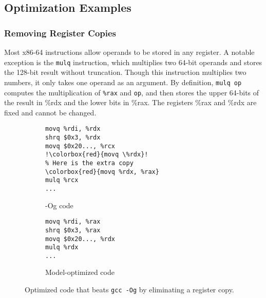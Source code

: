 \documentclass{article}
\begin{document}
\subsection{Optimization Examples}

\newcommand{\ozerocodecaption}{-O0 code\xspace}
\newcommand{\ogcodecaption}{-Og code\xspace}
\newcommand{\modelcodecaption}{Model-optimized code\xspace}
\newcommand{\codeboxwidth}{.47\columnwidth}

\subsubsection{Removing Register Copies}

Most x86-64 instructions allow operands to be stored in any register.  A notable exception is the  \texttt{mulq} instruction, which multiplies two 64-bit operands and stores the 128-bit result without truncation.
%
Though this instruction multiplies two numbers, it only takes one operand as an argument.  By definition, \texttt{mulq op} computes the multiplication of \texttt{\%rax} and \texttt{op}, and then stores the upper 64-bits of the result in \%rdx and the lower bits in \%rax.  The registers \%rax and \%rdx are fixed and cannot be changed.
%
\begin{figure}

    \begin{subfigure}[t]{\codeboxwidth}
    \begin{lstlisting}[language={[x64]Assembler},escapechar=!] 
movq %rdi, %rdx
shrq $0x3, %rdx
movq $0x20..., %rcx
!\colorbox{red}{movq \%rdx}!
% Here is the extra copy
\colorbox{red}{movq %rdx, %rax}
mulq %rcx
...
    \end{lstlisting}
    \caption{\ogcodecaption}
    \end{subfigure}
    \hfil
%
    \begin{subfigure}[t]{\codeboxwidth}
    \begin{lstlisting}
movq %rdi, %rax
shrq $0x3, %rax
movq $0x20..., %rdx
mulq %rdx
...
    \end{lstlisting}
    \caption{\modelcodecaption}
    \end{subfigure}
    \centering
    \caption{Optimized code that beats \texttt{gcc -Og} by eliminating a register copy.}
    \label{fig:elim_copy}

\end{figure}
\end{document}
